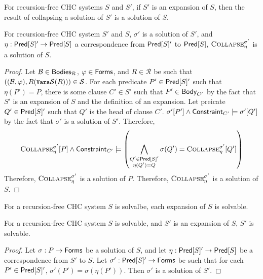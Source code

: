 For recursion-free CHC systems $S$ and $S'$, if $S'$ is
an expansion of $S$, then the result of collapsing a
solution of $S'$ is a solution of $S$.
%
\begin{lem}
  \label{lem:expansion-sound}
  For recursion-free CHC system $S'$ and $S$,
  $\sigma'$ is a solution of $S'$, and $\eta : \mathsf{Pred}[ S ]' \to
  \mathsf{Pred}[ S ]$ a correspondence from $\mathsf{Pred}[ S ]'$ to $\mathsf{Pred}[ S ]$,
  $\textsc{Collapse}_{\eta}^{\sigma'}$ is a solution of $S$.
\end{lem}
%
\begin{proof}
  Let $\mathcal{B} \in \mathsf{Bodies}_{\mathcal{R}}$, $\varphi \in \mathsf{Forms}$,
  and $R \in \mathcal{R}$ be such that $((\mathcal{B}, \varphi),
  R(\vars{ \mathcal{S} }(R))) \in \mathcal{S}$.
  For each predicate $P' \in \mathsf{Pred}[ S ]'$ such that $\eta(P') = P$, there is
  some clause $C' \in S'$ such that $P' \in \mathsf{Body}_{C'}$ by the fact that $S'$ is an expansion of
  $S$ and the definition of an expansion.
  Let preicate $Q' \in \mathsf{Pred}[ S ]'$ such that $Q'$ is the head of clause $C'$.
  $\sigma'[P'] \land \mathsf{Constraint}_{C'} \models \sigma'[Q']$ by
  the fact that $\sigma'$ is a solution of $S'$.
  Therefore,
  \[ \collapse{ \eta }{ \sigma' }[P] \land \consof{C'} \entails %
  \left( \bigland_{ \substack{Q' \in \predof{S}' \\ \eta(Q') = Q} }
  \sigma(Q') = %
  \collapse{\eta}{\sigma'}[Q'] \right)
  \]
  Therefore, $\textsc{Collapse}_{\eta}^{\sigma'}$ is a solution of $P$.
  Therefore, $\textsc{Collapse}_{\eta}^{\sigma'}$ is a solution of
  $S$.
\end{proof}

For a recursion-free CHC system $S$ is solvalbe, each expansion of $S$
is solvable.
\begin{lem}
  \label{lem:expansion-complete}
  For a recursion-free CHC system $S$ is solvable, and
  $S'$ is
  an expansion of $S$, $S'$ is solvable.
\end{lem}
%
\begin{proof}
  Let $\sigma : P \to \mathsf{Forms}$ be a solution of
  $S$, and let $\eta : \mathsf{Pred}[ S ]' \to \mathsf{Pred}[ S ]$ be a
  correspondence from $S'$ to $S$.
  Let $\sigma' : \mathsf{Pred}[ S ]' \to \mathsf{Forms}$ be such that for each $P'
  \in \mathsf{Pred}[ S ]'$, $\sigma'(P') = \sigma(\eta(P'))$.
  Then $\sigma'$ is a solution of $S'$.
\end{proof}

